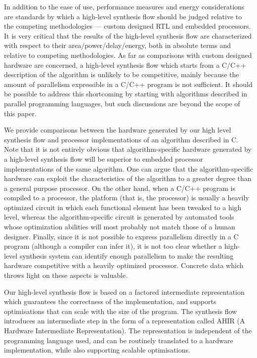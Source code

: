 \documentclass[conference]{IEEEtran}
\begin{document}
In addition to the ease of use, performance measures and energy
considerations are standards by which a high-level synthesis flow
should be judged relative to the competing methodologies --- custom
designed RTL and embedded processors.  It is very critical
that the results of the high-level synthesis flow are characterized
with respect to their area/power/delay/energy, both in absolute terms
and relative to competing methodologies.  As far as comparisons
with  custom designed hardware are concerned, a high-level synthesis flow
which starts from a C/C++ description of the algorithm is unlikely to
be competitive, mainly because the amount of parallelism expressible in 
a C/C++ program is not sufficient.   It should be possible to address
this shortcoming by starting with algorithms described in parallel
programming languages, but such discussions are beyond the scope of
this paper.   

We provide comparisons between
the hardware generated by our high level synthesis flow and  
processor implementations of an algorithm described in C.  
Note that it is not entirely obvious that algorithm-specific hardware 
generated by a high-level synthesis flow will be superior
to embedded processor implementations of the same algorithm.  
One can argue that the algorithm-specific hardware
can exploit the characteristics of the algorithm to a greater
degree than a general purpose processor.  
On the other hand, when a C/C++ program is compiled to
a processor, the platform (that is, the processor) is usually a
heavily optimized circuit in which each functional
element has been tweaked to a
high level, whereas the algorithm-specific
circuit is generated by automated tools whose optimization abilities
will most probably not match those of a human designer.   
Finally, since it is not possible to express parallelism
directly in a C program (although a compiler can infer it),
it is not too clear whether a high-level synthesis system can
identify enough parallelism to make the resulting hardware competitive
with a heavily optimized processor.  Concrete data which throws light on these aspects is valuable.

Our high-level synthesis flow is based on a factored intermediate
representation which guarantees the correctness of the implementation,
and supports optimisations that can scale with the size of the
program. The synthesis flow introduces an intermediate step in the
form of a representation called AHIR (A Hardware Intermediate
Representation). The representation is independent of the programming
language used, and can be routinely translated to a hardware
implementation, while also supporting scalable
optimisations\cite{AHIR_sameerds_hakim_2007}\cite{ahir_thesis}.
\end{document}
